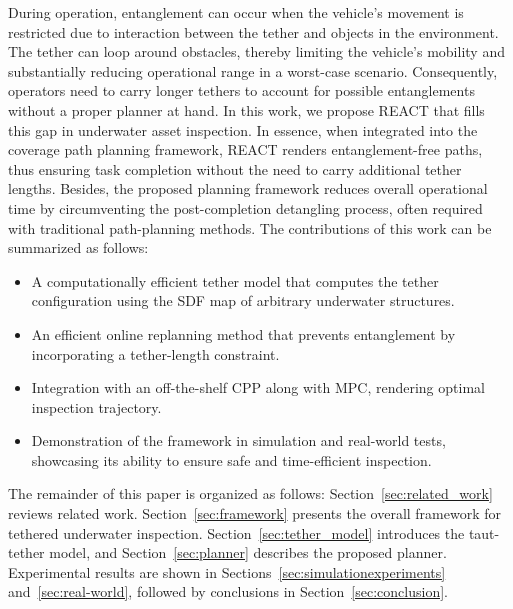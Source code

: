 %
%
 During operation, entanglement can occur when the vehicle's movement is restricted due to interaction between the tether and objects in the environment. The tether can loop around obstacles, thereby limiting the vehicle's mobility and substantially reducing operational range in a worst-case scenario. Consequently, operators need to carry longer tethers to account for possible entanglements without a proper planner at hand.
In this work, we propose \ac{REACT} that fills this gap in underwater asset inspection. In essence, when integrated into the coverage path planning framework, \ac{REACT} renders entanglement-free paths, thus ensuring task completion without the need to carry additional tether lengths. Besides, the proposed planning framework reduces overall operational time by circumventing the post-completion detangling process, often required with traditional path-planning methods. The contributions of this work can be summarized as follows:
\begin{itemize}
\item A computationally efficient tether model that computes the tether configuration using the \ac{SDF} map of arbitrary underwater structures.
\item An efficient online replanning method that prevents entanglement by incorporating a tether-length constraint.

\item Integration with an off-the-shelf \ac{CPP} along with \ac{MPC}, rendering optimal inspection trajectory.
\item Demonstration of the framework in simulation and real-world tests, showcasing its ability to ensure safe and time-efficient inspection.
\end{itemize}










The remainder of this paper is organized as follows: Section~\ref{sec:related_work} reviews related work. Section~\ref{sec:framework} presents the overall framework for tethered underwater inspection. Section~\ref{sec:tether_model} introduces the taut-tether model, and Section~\ref{sec:planner} describes the proposed planner. Experimental results are shown in Sections~\ref{sec:simulationexperiments} and~\ref{sec:real-world}, followed by conclusions in Section~\ref{sec:conclusion}.






